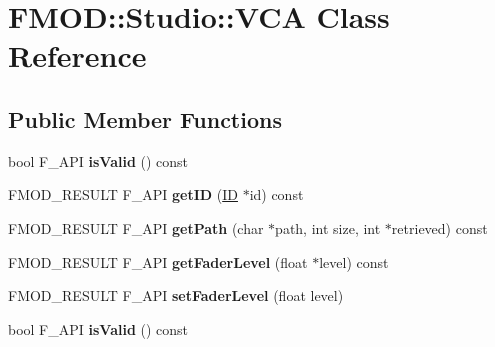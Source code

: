 \hypertarget{class_f_m_o_d_1_1_studio_1_1_v_c_a}{\section{F\+M\+O\+D\+:\+:Studio\+:\+:V\+C\+A Class Reference}
\label{class_f_m_o_d_1_1_studio_1_1_v_c_a}
}
\subsection*{Public Member Functions}
\begin{DoxyCompactItemize}
\item 
\hypertarget{class_f_m_o_d_1_1_studio_1_1_v_c_a_a06822046ee5af40c87a9c592786715c5}{bool F\+\_\+\+A\+P\+I {\bfseries is\+Valid} () const }\label{class_f_m_o_d_1_1_studio_1_1_v_c_a_a06822046ee5af40c87a9c592786715c5}

\item 
\hypertarget{class_f_m_o_d_1_1_studio_1_1_v_c_a_abd89b599f285b4ef456f2d0bb5be1969}{F\+M\+O\+D\+\_\+\+R\+E\+S\+U\+L\+T F\+\_\+\+A\+P\+I {\bfseries get\+I\+D} (\hyperlink{struct_f_m_o_d___g_u_i_d}{I\+D} $\ast$id) const }\label{class_f_m_o_d_1_1_studio_1_1_v_c_a_abd89b599f285b4ef456f2d0bb5be1969}

\item 
\hypertarget{class_f_m_o_d_1_1_studio_1_1_v_c_a_a42ceb60f83131c48b36265aef592d402}{F\+M\+O\+D\+\_\+\+R\+E\+S\+U\+L\+T F\+\_\+\+A\+P\+I {\bfseries get\+Path} (char $\ast$path, int size, int $\ast$retrieved) const }\label{class_f_m_o_d_1_1_studio_1_1_v_c_a_a42ceb60f83131c48b36265aef592d402}

\item 
\hypertarget{class_f_m_o_d_1_1_studio_1_1_v_c_a_a26e3d753fb1962b13bf96c14a864c015}{F\+M\+O\+D\+\_\+\+R\+E\+S\+U\+L\+T F\+\_\+\+A\+P\+I {\bfseries get\+Fader\+Level} (float $\ast$level) const }\label{class_f_m_o_d_1_1_studio_1_1_v_c_a_a26e3d753fb1962b13bf96c14a864c015}

\item 
\hypertarget{class_f_m_o_d_1_1_studio_1_1_v_c_a_a24b9659c4ebb3b197377b864f13e04f6}{F\+M\+O\+D\+\_\+\+R\+E\+S\+U\+L\+T F\+\_\+\+A\+P\+I {\bfseries set\+Fader\+Level} (float level)}\label{class_f_m_o_d_1_1_studio_1_1_v_c_a_a24b9659c4ebb3b197377b864f13e04f6}

\item 
\hypertarget{class_f_m_o_d_1_1_studio_1_1_v_c_a_a06822046ee5af40c87a9c592786715c5}{bool F\+\_\+\+A\+P\+I {\bfseries is\+Valid} () const }\label{class_f_m_o_d_1_1_studio_1_1_v_c_a_a06822046ee5af40c87a9c592786715c5}


\end{DoxyCompactItemize}
